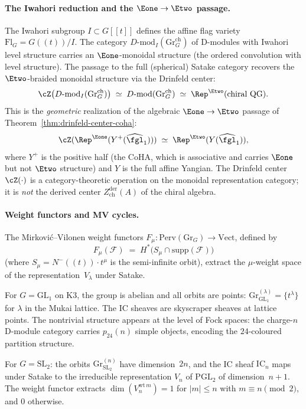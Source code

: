 \paragraph{The Iwahori reduction and the \texorpdfstring{$\Eone \to \Etwo$}{E1 -> E2} passage.}
The Iwahori subgroup $I \subset G[\![t]\!]$ defines the affine flag variety $\mathrm{Fl}_G = G(\!(t)\!)/I$.
The category $D\text{-}\mathrm{mod}_I(\mathrm{Gr}^{\mathrm{ch}}_G)$ of D-modules with Iwahori level structure carries an $\Eone$-monoidal structure (the ordered convolution with level structure).
The passage to the full (spherical) Satake category recovers the $\Etwo$-braided monoidal structure via the Drinfeld center:
\[
 \cZ\bigl(D\text{-}\mathrm{mod}_I(\mathrm{Gr}^{\mathrm{ch}}_G)\bigr)
 \;\simeq\;
 D\text{-}\mathrm{mod}(\mathrm{Gr}^{\mathrm{ch}}_G)
 \;\simeq\;
 \Rep^{\Etwo}(\text{chiral QG}).
\]
This is the \emph{geometric} realization of the algebraic $\Eone \to \Etwo$ passage of Theorem~\ref{thm:drinfeld-center-coha}:
\[
 \cZ(\Rep^{\Eone}(Y^+(\widehat{\fgl}_1))) \;\simeq\; \Rep^{\Etwo}(Y(\widehat{\fgl}_1)),
\]
where $Y^+$ is the positive half (the CoHA, which is associative and carries $\Eone$ but not $\Etwo$ structure) and $Y$ is the full affine Yangian.
The Drinfeld center $\cZ(\cdot)$ is a category-theoretic operation on the monoidal representation category; it is \emph{not} the derived center $Z^{\mathrm{der}}_{\mathrm{ch}}(A)$ of the chiral algebra.

\paragraph{Weight functors and MV cycles.}
The Mirkovi\'c--Vilonen weight functors $F_\mu\colon \mathrm{Perv}(\mathrm{Gr}_G) \to \mathrm{Vect}$, defined by
\[
 F_\mu(\mathcal{F}) \;=\; H^*\bigl(S_\mu \cap \mathrm{supp}(\mathcal{F})\bigr)
\]
(where $S_\mu = N^-(\!(t)\!) \cdot t^\mu$ is the semi-infinite orbit), extract the $\mu$-weight space of the representation~$V_\lambda$ under Satake.

For $G = \mathrm{GL}_1$ on K3, the group is abelian and all orbits are points: $\mathrm{Gr}^{(\lambda)}_{\mathrm{GL}_1} = \{t^\lambda\}$ for $\lambda$ in the Mukai lattice.
The IC sheaves are skyscraper sheaves at lattice points.
The nontrivial structure appears at the level of Fock spaces: the charge-$n$ D-module category carries $p_{24}(n)$ simple objects, encoding the $24$-coloured partition structure.

For $G = \mathrm{SL}_2$: the orbits $\mathrm{Gr}^{(n)}_{\mathrm{SL}_2}$ have dimension~$2n$, and the IC sheaf $\mathrm{IC}_n$ maps under Satake to the irreducible representation $V_n$ of $\mathrm{PGL}_2$ of dimension~$n+1$.
The weight functor extracts $\dim(V_n^{\mathrm{wt}\,m}) = 1$ for $|m| \leq n$ with $m \equiv n \pmod{2}$, and $0$ otherwise.

